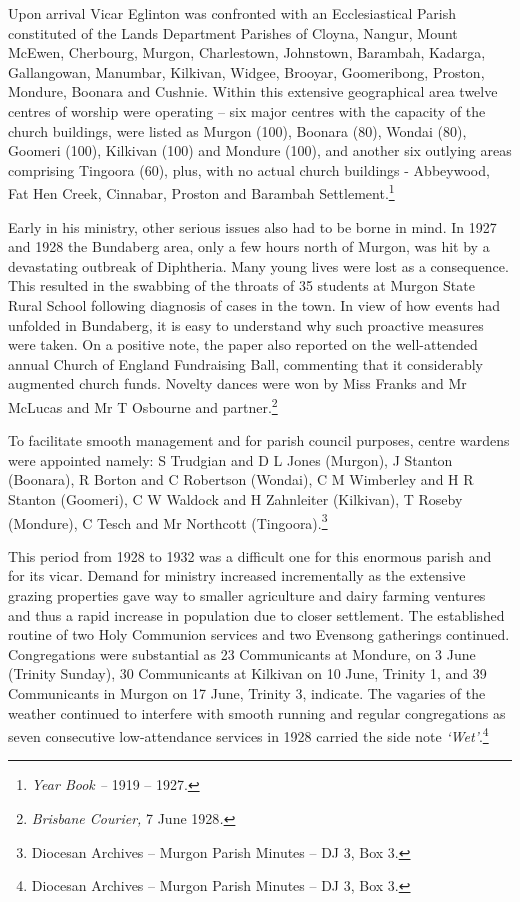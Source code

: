 Upon arrival Vicar Eglinton was confronted with an Ecclesiastical Parish constituted of the Lands Department Parishes of Cloyna, Nangur, Mount McEwen, Cherbourg, Murgon, Charlestown, Johnstown, Barambah, Kadarga, Gallangowan, Manumbar, Kilkivan, Widgee, Brooyar, Goomeribong, Proston, Mondure, Boonara and Cushnie. Within this extensive geographical area twelve centres of worship were operating -- six major centres with the capacity of the church buildings, were listed as Murgon (100), Boonara (80), Wondai (80), Goomeri (100), Kilkivan (100) and Mondure (100), and another six outlying areas comprising Tingoora (60), plus, with no actual church buildings - Abbeywood, Fat Hen Creek, Cinnabar, Proston and Barambah Settlement.\footnote{\emph{Year Book --} 1919 -- 1927.}


Early in his ministry, other serious issues also had to be borne in mind. In 1927 and 1928 the Bundaberg area, only a few hours north of Murgon, was hit by a devastating outbreak of Diphtheria. Many young lives were lost as a consequence. This resulted in the swabbing of the throats of 35 students at Murgon State Rural School following diagnosis of cases in the town. In view of how events had unfolded in Bundaberg, it is easy to understand why such proactive measures were taken. On a positive note, the paper also reported on the well-attended annual Church of England Fundraising Ball, commenting that it considerably augmented church funds. Novelty dances were won by Miss Franks and Mr McLucas and Mr T Osbourne and partner.\footnote{\emph{Brisbane Courier,} 7 June 1928\emph{.}}


To facilitate smooth management and for parish council purposes, centre wardens were appointed namely: S Trudgian and D L Jones (Murgon), J Stanton (Boonara), R Borton and C Robertson (Wondai), C M Wimberley and H R Stanton (Goomeri), C W Waldock and H Zahnleiter (Kilkivan), T Roseby (Mondure), C Tesch and Mr Northcott (Tingoora).\footnote{Diocesan Archives -- Murgon Parish Minutes -- DJ 3, Box 3.}


This period from 1928 to 1932 was a difficult one for this enormous parish and for its vicar. Demand for ministry increased incrementally as the extensive grazing properties gave way to smaller agriculture and dairy farming ventures and thus a rapid increase in population due to closer settlement. The established routine of two Holy Communion services and two Evensong gatherings continued. Congregations were substantial as 23 Communicants at Mondure, on 3 June (Trinity Sunday), 30 Communicants at Kilkivan on 10 June, Trinity 1, and 39 Communicants in Murgon on 17 June, Trinity 3, indicate. The vagaries of the weather continued to interfere with smooth running and regular congregations as seven consecutive low-attendance services in 1928 carried the side note \emph{`Wet'}.\footnote{Diocesan Archives -- Murgon Parish Minutes -- DJ 3, Box 3.}


